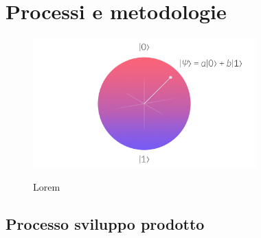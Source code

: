 \chapter{Processi e metodologie}
\label{chap:processi-metodologie}

\begin{figure}[H]
    \centering
    \includegraphics[alt={Testo alternativo dell'immagine}, height=5cm]{img/qubit.jpeg}
    \caption{Lorem}
    \label{fig:qubit}
\end{figure}


\section{Processo sviluppo prodotto}






\newpage